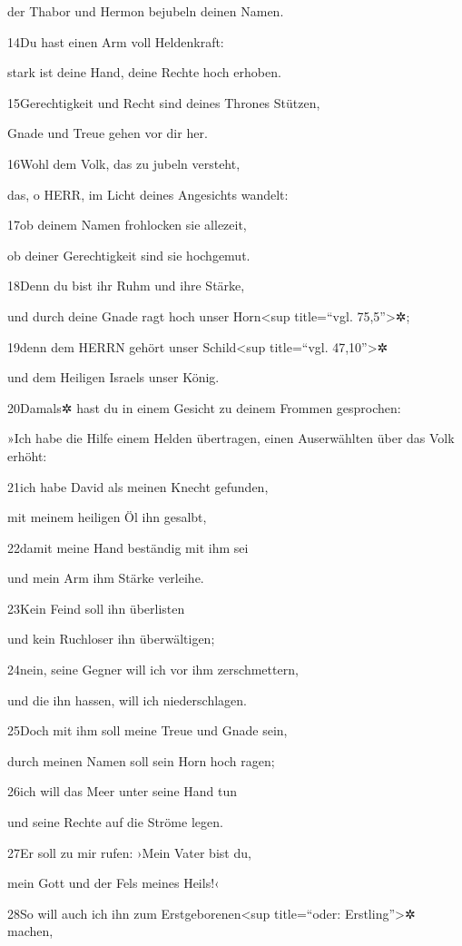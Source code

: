 der Thabor und Hermon bejubeln deinen Namen.

14Du hast einen Arm voll Heldenkraft:

stark ist deine Hand, deine Rechte hoch erhoben.

15Gerechtigkeit und Recht sind deines Thrones Stützen,

Gnade und Treue gehen vor dir her.

16Wohl dem Volk, das zu jubeln versteht,

das, o HERR, im Licht deines Angesichts wandelt:

17ob deinem Namen frohlocken sie allezeit,

ob deiner Gerechtigkeit sind sie hochgemut.

18Denn du bist ihr Ruhm und ihre Stärke,

und durch deine Gnade ragt hoch unser Horn\textless sup title=``vgl.
75,5''\textgreater✲;

19denn dem HERRN gehört unser Schild\textless sup title=``vgl.
47,10''\textgreater✲

und dem Heiligen Israels unser König.

20Damals✲ hast du in einem Gesicht zu deinem Frommen gesprochen:

»Ich habe die Hilfe einem Helden übertragen, einen Auserwählten über das
Volk erhöht:

21ich habe David als meinen Knecht gefunden,

mit meinem heiligen Öl ihn gesalbt,

22damit meine Hand beständig mit ihm sei

und mein Arm ihm Stärke verleihe.

23Kein Feind soll ihn überlisten

und kein Ruchloser ihn überwältigen;

24nein, seine Gegner will ich vor ihm zerschmettern,

und die ihn hassen, will ich niederschlagen.

25Doch mit ihm soll meine Treue und Gnade sein,

durch meinen Namen soll sein Horn hoch ragen;

26ich will das Meer unter seine Hand tun

und seine Rechte auf die Ströme legen.

27Er soll zu mir rufen: ›Mein Vater bist du,

mein Gott und der Fels meines Heils!‹

28So will auch ich ihn zum Erstgeborenen\textless sup title=``oder:
Erstling''\textgreater✲ machen,


